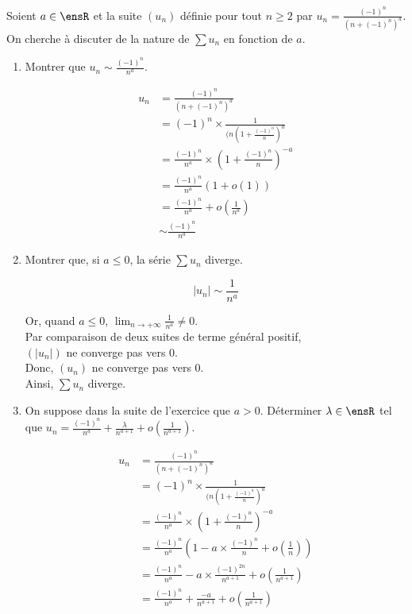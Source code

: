 \noindent Soient $a \in \ensR$ et la suite $(u_n)$ définie pour tout $n \geq 2$ par $\displaystyle u_n = \frac{(-1)^n}{(n + (-1)^n)^a}$. On cherche à discuter de la nature de $\sum u_n$ en fonction de $a$.

\begin{enumerate}
    \item Montrer que $\displaystyle u_n \sim \frac{(-1)^n}{n^a}$.

    \exobox
    {
        \begin{align*}
            u_n &= \frac{(-1)^n}{(n + (-1)^n)^a} \\
            &= (-1)^n \times \frac{1}{(n(1 + \frac{(-1)^n}{n})^a} \\
            &= \frac{(-1)^n}{n^a} \times (1 + \frac{(-1)^n}{n})^{-a} \\
            &= \frac{(-1)^n}{n^a} (1 + o(1)) \\
            &= \frac{(-1)^n}{n^a} + o(\frac{1}{n^a}) \\
            &\sim \frac{(-1)^n}{n^a}
        \end{align*}
    }

    \vspace{10px}

    \item Montrer que, si $a \leq 0$, la série $\sum u_n$ diverge.

    \exobox
    {
        $$
            |u_n| \sim \frac{1}{n^a}
        $$

        Or, quand $a \leq 0$, $\displaystyle \lim_{n \to + \infty} \frac{1}{n^a} \neq 0$. \\
        Par comparaison de deux suites de terme général positif, \\
        $(|u_n|)$ ne converge pas vers 0. \\
        Donc, $(u_n)$ ne converge pas vers 0. \\
        Ainsi, $\sum u_n$ diverge.
    }

    \vspace{10px}
    
    \item On suppose dans la suite de l'exercice que $a > 0$. Déterminer $\lambda \in \ensR$ tel que $\displaystyle u_n = \frac{(-1)^n}{n^a} + \frac{\lambda}{n^{a + 1}} + o(\frac{1}{n^{a + 1}})$.

    \exobox
    {
        \begin{align*}
            u_n &= \frac{(-1)^n}{(n + (-1)^n)^a} \\
            &= (-1)^n \times \frac{1}{(n(1 + \frac{(-1)^n}{n})^a} \\
            &= \frac{(-1)^n}{n^a} \times (1 + \frac{(-1)^n}{n})^{-a} \\
            &= \frac{(-1)^n}{n^a} (1 - a \times \frac{(-1)^n}{n} + o(\frac{1}{n})) \\
            &= \frac{(-1)^n}{n^a} - a \times \frac{(-1)^{2n}}{n^{a + 1}} + o(\frac{1}{n^{a + 1}}) \\
            &= \frac{(-1)^n}{n^a} + \frac{- a}{n^{a + 1}} + o(\frac{1}{n^{a + 1}})
        \end{align*}

}
\end{enumerate}
